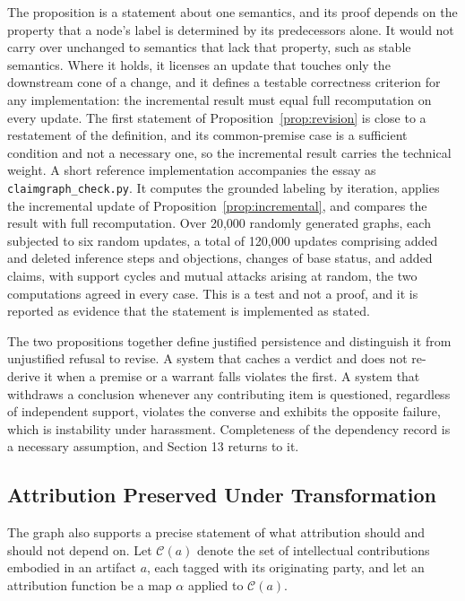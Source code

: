 \documentclass[12pt]{article}
\theoremstyle{definition}
\theoremstyle{remark}
\begin{document}
The proposition is a statement about one semantics, and its proof depends on the property that a node's label is determined by its predecessors alone. It would not carry over unchanged to semantics that lack that property, such as stable semantics. Where it holds, it licenses an update that touches only the downstream cone of a change, and it defines a testable correctness criterion for any implementation: the incremental result must equal full recomputation on every update. The first statement of Proposition~\ref{prop:revision} is close to a restatement of the definition, and its common-premise case is a sufficient condition and not a necessary one, so the incremental result carries the technical weight. A short reference implementation accompanies the essay as \texttt{claimgraph\_check.py}. It computes the grounded labeling by iteration, applies the incremental update of Proposition~\ref{prop:incremental}, and compares the result with full recomputation. Over 20,000 randomly generated graphs, each subjected to six random updates, a total of 120,000 updates comprising added and deleted inference steps and objections, changes of base status, and added claims, with support cycles and mutual attacks arising at random, the two computations agreed in every case. This is a test and not a proof, and it is reported as evidence that the statement is implemented as stated.

The two propositions together define justified persistence and distinguish it from unjustified refusal to revise. A system that caches a verdict and does not re-derive it when a premise or a warrant falls violates the first. A system that withdraws a conclusion whenever any contributing item is questioned, regardless of independent support, violates the converse and exhibits the opposite failure, which is instability under harassment. Completeness of the dependency record is a necessary assumption, and Section 13 returns to it.

\subsection{Attribution Preserved Under Transformation}

The graph also supports a precise statement of what attribution should and should not depend on. Let $\mathcal C(a)$ denote the set of intellectual contributions embodied in an artifact $a$, each tagged with its originating party, and let an attribution function be a map $\alpha$ applied to $\mathcal C(a)$.
\end{document}
